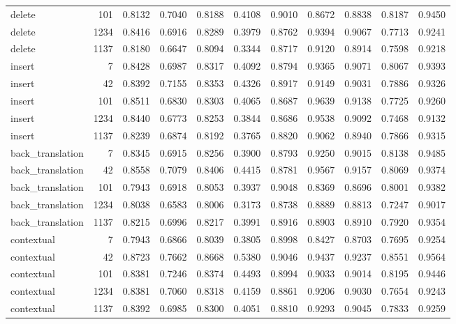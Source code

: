 \begin{table}
\begin{tabular}{lrrrrrrrrrr}
delete & 101 & 0.8132 & 0.7040 & 0.8188 & 0.4108 & 0.9010 & 0.8672 & 0.8838 & 0.8187 & 0.9450 \\
delete & 1234 & 0.8416 & 0.6916 & 0.8289 & 0.3979 & 0.8762 & 0.9394 & 0.9067 & 0.7713 & 0.9241 \\
delete & 1137 & 0.8180 & 0.6647 & 0.8094 & 0.3344 & 0.8717 & 0.9120 & 0.8914 & 0.7598 & 0.9218 \\
insert & 7 & 0.8428 & 0.6987 & 0.8317 & 0.4092 & 0.8794 & 0.9365 & 0.9071 & 0.8067 & 0.9393 \\
insert & 42 & 0.8392 & 0.7155 & 0.8353 & 0.4326 & 0.8917 & 0.9149 & 0.9031 & 0.7886 & 0.9326 \\
insert & 101 & 0.8511 & 0.6830 & 0.8303 & 0.4065 & 0.8687 & 0.9639 & 0.9138 & 0.7725 & 0.9260 \\
insert & 1234 & 0.8440 & 0.6773 & 0.8253 & 0.3844 & 0.8686 & 0.9538 & 0.9092 & 0.7468 & 0.9132 \\
insert & 1137 & 0.8239 & 0.6874 & 0.8192 & 0.3765 & 0.8820 & 0.9062 & 0.8940 & 0.7866 & 0.9315 \\
back\_translation & 7 & 0.8345 & 0.6915 & 0.8256 & 0.3900 & 0.8793 & 0.9250 & 0.9015 & 0.8138 & 0.9485 \\
back\_translation & 42 & 0.8558 & 0.7079 & 0.8406 & 0.4415 & 0.8781 & 0.9567 & 0.9157 & 0.8069 & 0.9374 \\
back\_translation & 101 & 0.7943 & 0.6918 & 0.8053 & 0.3937 & 0.9048 & 0.8369 & 0.8696 & 0.8001 & 0.9382 \\
back\_translation & 1234 & 0.8038 & 0.6583 & 0.8006 & 0.3173 & 0.8738 & 0.8889 & 0.8813 & 0.7247 & 0.9017 \\
back\_translation & 1137 & 0.8215 & 0.6996 & 0.8217 & 0.3991 & 0.8916 & 0.8903 & 0.8910 & 0.7920 & 0.9354 \\
contextual & 7 & 0.7943 & 0.6866 & 0.8039 & 0.3805 & 0.8998 & 0.8427 & 0.8703 & 0.7695 & 0.9254 \\
contextual & 42 & 0.8723 & 0.7662 & 0.8668 & 0.5380 & 0.9046 & 0.9437 & 0.9237 & 0.8551 & 0.9564 \\
contextual & 101 & 0.8381 & 0.7246 & 0.8374 & 0.4493 & 0.8994 & 0.9033 & 0.9014 & 0.8195 & 0.9446 \\
contextual & 1234 & 0.8381 & 0.7060 & 0.8318 & 0.4159 & 0.8861 & 0.9206 & 0.9030 & 0.7654 & 0.9243 \\
contextual & 1137 & 0.8392 & 0.6985 & 0.8300 & 0.4051 & 0.8810 & 0.9293 & 0.9045 & 0.7833 & 0.9259 \\
\bottomrule
\end{tabular}
\end{table}
